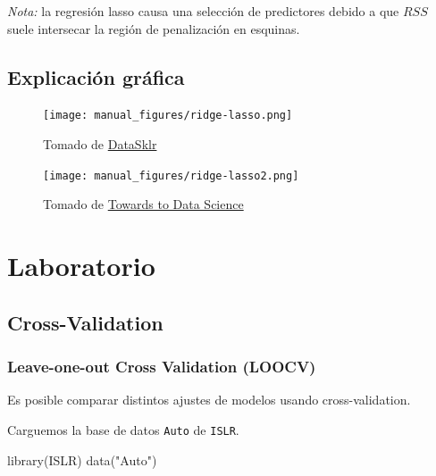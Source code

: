 \documentclass[
  12pt,
]{book}
\newenvironment{Shaded}{\begin{snugshade}}{\end{snugshade}}
\newcommand{\FunctionTok}[1]{\textcolor[rgb]{0.00,0.00,0.00}{#1}}
\newcommand{\NormalTok}[1]{#1}
\newcommand{\StringTok}[1]{\textcolor[rgb]{0.31,0.60,0.02}{#1}}
\theoremstyle{definition}
\theoremstyle{definition}
\theoremstyle{definition}
\theoremstyle{definition}
\theoremstyle{remark}
\begin{document}
\emph{Nota:} la regresión lasso causa una selección de predictores debido a que \(RSS\) suele intersecar la región de penalización en esquinas.

\hypertarget{explicaciuxf3n-gruxe1fica}{%
\subsection{Explicación gráfica}\label{explicaciuxf3n-gruxe1fica}}

\begin{figure}
\centering
\texttt{[image: manual\_figures/ridge-lasso.png]}
\caption{Tomado de \href{https://www.datasklr.com/extensions-of-ols-regression/regularization-and-shrinkage-ridge-lasso-and-elastic-net-regression}{DataSklr}}
\end{figure}

\begin{figure}
\centering
\texttt{[image: manual\_figures/ridge-lasso2.png]}
\caption{Tomado de \href{https://towardsdatascience.com/regularization-in-machine-learning-connecting-the-dots-c6e030bfaddd}{Towards to Data Science}}
\end{figure}

\hypertarget{laboratorio-6}{%
\section{Laboratorio}\label{laboratorio-6}}

\hypertarget{cross-validation}{%
\subsection{Cross-Validation}\label{cross-validation}}

\hypertarget{leave-one-out-cross-validation-loocv}{%
\subsubsection{Leave-one-out Cross Validation (LOOCV)}\label{leave-one-out-cross-validation-loocv}}

Es posible comparar distintos ajustes de modelos usando cross-validation.

Carguemos la base de datos \texttt{Auto} de \texttt{ISLR}.

\begin{Shaded}
\begin{Highlighting}[]
\FunctionTok{library}\NormalTok{(ISLR)}
\FunctionTok{data}\NormalTok{(}\StringTok{"Auto"}\NormalTok{)}
\end{Highlighting}
\end{Shaded}
\end{document}
